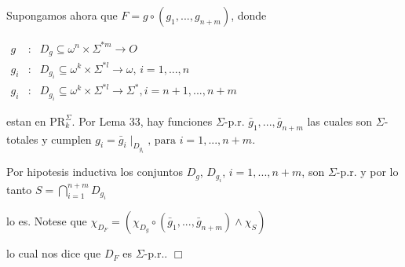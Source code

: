   Supongamos ahora que \(F=g\circ (g_{1},...,g_{n+m})\), donde

  \(\displaystyle \begin{array}{rcl} g & :& D_{g}\subseteq \omega ^{n}\times \Sigma ^{\ast m}\rightarrow O \\ g_{i} & :& D_{g_{i}}\subseteq \omega ^{k}\times \Sigma ^{\ast l}\rightarrow \omega \text{, }i=1,...,n \\ g_{i} & :& D_{g_{i}}\subseteq \omega ^{k}\times \Sigma ^{\ast l}\rightarrow \Sigma ^{\ast },i=n+1,...,n+m \end{array} \)

  estan en \(\mathrm{PR}_{k}^{\Sigma }.\) Por Lema 33, hay funciones \(\Sigma \)-p.r. \(\bar{g}_{1},...,\bar{g}_{n+m}\) las cuales son \( \Sigma \)-totales y cumplen
  \(\displaystyle g_{i}=\bar{g}_{i}\mid _{D_{g_{i}}}\text{, para }i=1,...,n+m. \)

  Por hipotesis inductiva los conjuntos \(D_{g}\), \(D_{g_{i}}\), \(i=1,...,n+m\), son \(\Sigma \)-p.r. y por lo tanto
  \(\displaystyle S=\bigcap_{i=1}^{n+m}D_{g_{i}} \)

  lo es. Notese que
  \(\displaystyle \chi _{D_{F}}=(\chi _{D_{g}}\circ \left( \bar{g}_{1},...,\bar{g} _{n+m}\right) \wedge \chi _{S}) \)

  lo cual nos dice que \(D_{F}\) es \(\Sigma \)-p.r.. \(\Box\)
